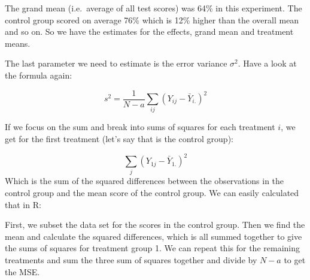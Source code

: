 \documentclass[
  letterpaper,
]{book}
\newenvironment{Shaded}{\begin{snugshade}}{\end{snugshade}}
\newcommand{\CommentTok}[1]{\textcolor[rgb]{0.56,0.35,0.01}{\textit{#1}}}
\newcommand{\DecValTok}[1]{\textcolor[rgb]{0.00,0.00,0.81}{#1}}
\newcommand{\FunctionTok}[1]{\textcolor[rgb]{0.13,0.29,0.53}{\textbf{#1}}}
\newcommand{\NormalTok}[1]{#1}
\newcommand{\OtherTok}[1]{\textcolor[rgb]{0.56,0.35,0.01}{#1}}
\newcommand{\SpecialCharTok}[1]{\textcolor[rgb]{0.81,0.36,0.00}{\textbf{#1}}}
\newcommand{\StringTok}[1]{\textcolor[rgb]{0.31,0.60,0.02}{#1}}
\begin{document}
The grand mean (i.e.~average of all test scores) was 64\% in this
experiment. The control group scored on average 76\% which is 12\%
higher than the overall mean and so on. So we have the estimates for the
effects, grand mean and treatment means.

The last parameter we need to estimate is the error variance
\(\sigma^2\). Have a look at the formula again:

\[ s^2 = \frac{1}{N-a}\sum_{ij}(Y_{ij} - \bar{Y}_{i.})^2 \]

If we focus on the sum and break into sums of squares for each treatment
\(i\), we get for the first treatment (let's say that is the control
group):

\[ \sum_{j}(Y_{1j} - \bar{Y}_{1.})^2 \] Which is the sum of the squared
differences between the observations in the control group and the mean
score of the control group. We can easily calculated that in R:

\begin{Shaded}
\end{Shaded}

First, we subset the data set for the scores in the control group. Then
we find the mean and calculate the squared differences, which is all
summed together to give the sums of squares for treatment group 1. We
can repeat this for the remaining treatments and sum the three sum of
squares together and divide by \(N-a\) to get the MSE.
\end{document}
